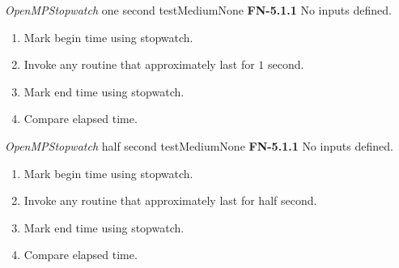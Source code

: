 \begin{testcase}{\emph{OpenMPStopwatch} one second test}{Medium}{None}
	{
		\textbf{FN-5.1.1}
	}
	{
		No inputs defined.
	}
	{
		\begin{enumerate}
			\item Mark begin time using stopwatch.
			\item Invoke any routine that approximately last for $1$ second.
			\item Mark end time using stopwatch.
			\item Compare elapsed time.
		\end{enumerate}
	}
\end{testcase}
\begin{testcase}{\emph{OpenMPStopwatch} half second test}{Medium}{None}
	{
		\textbf{FN-5.1.1}
	}
	{
		No inputs defined.
	}
	{
		\begin{enumerate}
			\item Mark begin time using stopwatch.
			\item Invoke any routine that approximately last for half second.
			\item Mark end time using stopwatch.
			\item Compare elapsed time.
		\end{enumerate}
	}
\end{testcase}